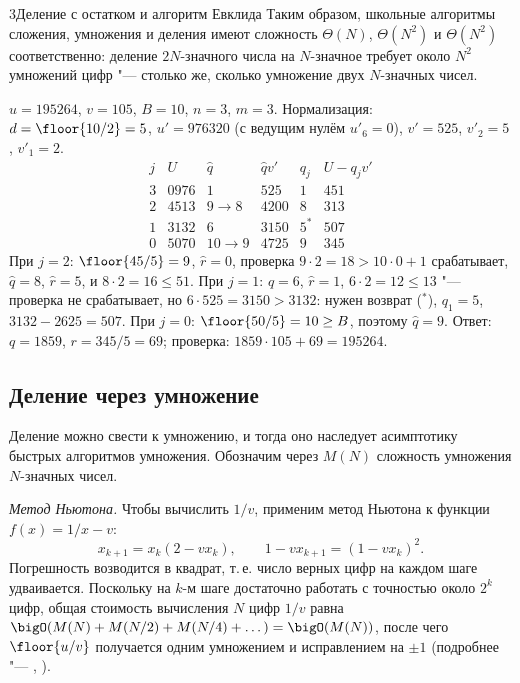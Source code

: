 \begin{lecture}{3}{Деление с остатком и алгоритм Евклида}
Таким образом, школьные алгоритмы сложения, умножения и деления имеют сложность $\Theta(N)$,
$\Theta(N^2)$ и $\Theta(N^2)$ соответственно: деление $2N$-значного числа на $N$-значное
требует около $N^2$ умножений цифр "--- столько же, сколько умножение двух $N$-значных чисел.

\begin{example}\label{l3:algD-hand}
$u = 195264$, $v = 105$, $B = 10$, $n = 3$, $m = 3$. Нормализация: $d = \floor{10/2} = 5$,
$u' = 976320$ (с ведущим нулём $u'_6 = 0$), $v' = 525$, $v'_2 = 5$, $v'_1 = 2$.
\[
\begin{array}{c|c|l|r|c|c}
  j & U & \hat q & \hat q v' & q_j & U - q_j v' \\ \hline
  3 & 0976 & 1 & 525 & 1 & 451\\
  2 & 4513 & 9 \to 8 & 4200 & 8 & 313\\
  1 & 3132 & 6 & 3150 & 5^{*} & 507\\
  0 & 5070 & 10 \to 9 & 4725 & 9 & 345
\end{array}
\]
При $j = 2$: $\floor{45/5} = 9$, $\hat r = 0$, проверка $9 \cdot 2 = 18 > 10 \cdot 0 + 1$ срабатывает,
$\hat q = 8$, $\hat r = 5$, и $8 \cdot 2 = 16 \le 51$. При $j = 1$: $\hat q = 6$, $\hat r = 1$,
$6 \cdot 2 = 12 \le 13$ "--- проверка не срабатывает, но $6 \cdot 525 = 3150 > 3132$: нужен возврат
($^{*}$), $q_1 = 5$, $3132 - 2625 = 507$. При $j = 0$: $\floor{50/5} = 10 \ge B$, поэтому
$\hat q = 9$. Ответ: $q = 1859$, $r = 345/5 = 69$; проверка: $1859 \cdot 105 + 69 = 195264$.
\end{example}




\subsection{Деление через умножение}

Деление можно свести к умножению, и тогда оно наследует асимптотику быстрых алгоритмов
умножения. Обозначим через $M(N)$ сложность умножения $N$-значных чисел.

\emph{Метод Ньютона.} Чтобы вычислить $1/v$, применим метод Ньютона к функции
$f(x) = 1/x - v$:
\[
  x_{k+1} = x_k (2 - v x_k), \qquad 1 - v x_{k+1} = (1 - v x_k)^2.
\]
Погрешность возводится в квадрат, т.\,е. число верных цифр на каждом шаге удваивается.
Поскольку на $k$-м шаге достаточно работать с точностью около $2^k$ цифр, общая стоимость
вычисления $N$ цифр $1/v$ равна $\bigO(M(N) + M(N/2) + M(N/4) + \dots) = \bigO(M(N))$, после чего
$\floor{u/v}$ получается одним умножением и исправлением на $\pm 1$
(подробнее "--- \cite[разд.~3.4]{brent-zimmermann}, \cite[разд.~9.2.2]{crandall-pomerance}).


\end{lecture}
